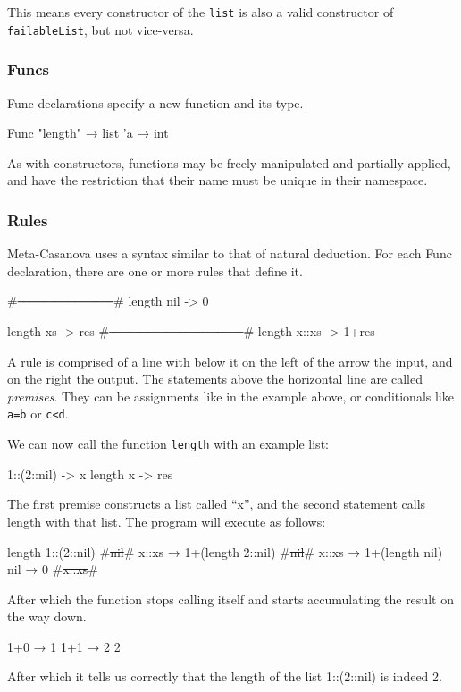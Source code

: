   \noindent
  This means every constructor of the \verb|list| is also a valid constructor of \verb|failableList|, but not vice-versa.

  \subsubsection*{Funcs}
  Func declarations specify a new function and its type.

  \begin{code}
  Func "length" → list 'a → int
  \end{code}

  As with constructors, functions may be freely manipulated and partially applied, and have the restriction that their name must be unique in their namespace.

  \subsubsection*{Rules}
  Meta-Casanova uses a syntax similar to that of natural deduction.
  For each Func declaration, there are one or more rules that define it.

  \begin{code}
  #\verb|───────────────|#
  length nil -> 0

  length xs -> res
  #\verb|─────────────────────|#
  length x::xs -> 1+res
  \end{code}
  
  A rule is comprised of a line with below it on the left of the arrow the input, and on the right the output.
  The statements above the horizontal line are called \textit{premises}.
  They can be assignments like in the example above, or conditionals like \verb|a=b| or \verb|c<d|.

  We can now call the function \verb|length| with an example list:

  \begin{code}
    1::(2::nil) -> x
    length x    -> res
  \end{code}

  The first premise constructs a list called ``x'', and the second statement calls length with that list.
  The program will execute as follows:

  \begin{code}
  length 1::(2::nil)
      #\st{nil}#
      x::xs → 1+(length 2::nil)
          #\st{nil}#
          x::xs → 1+(length nil)
              nil → 0
              #\st{x::xs}#
  \end{code}

  \noindent
  After which the function stops calling itself and starts accumulating the result on the way down.
  
  \begin{code}
         1+0 → 1
     1+1 → 2
  2
  \end{code}

  \noindent
  After which it tells us correctly that the length of the list 1::(2::nil) is indeed 2.
